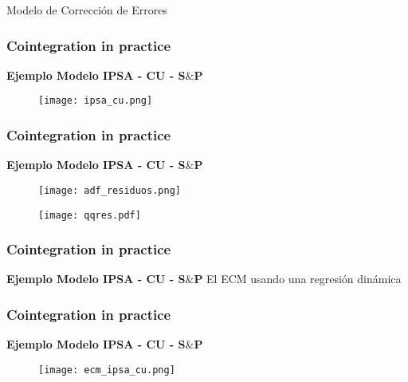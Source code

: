 \documentclass[spanish,xcolor=table]{beamer}
\begin{document}
\begin{section}{Modelo de Correcci\'on de Errores}
\begin{frame}
\end{frame}

\begin{frame}
\frametitle{Cointegration in practice}
\textbf{Ejemplo Modelo IPSA - CU - S$\&$P}

\begin{figure}[t!]
\texttt{[image: ipsa\_cu.png]}
\end{figure}
\end{frame}

\begin{frame}
\frametitle{Cointegration in practice}
\textbf{Ejemplo Modelo IPSA - CU - S$\&$P}

\begin{figure}[t!]
\texttt{[image: adf\_residuos.png]}
\end{figure}
\begin{figure}[t!]
\texttt{[image: qqres.pdf]}
\end{figure}
\end{frame}

\begin{frame}
\frametitle{Cointegration in practice}
\textbf{Ejemplo Modelo IPSA - CU - S$\&$P}
 \vspace{4mm}	
El ECM usando una regresi\'on din\'amica\\
 \vspace{4mm}	


\end{frame}

\begin{frame}
\frametitle{Cointegration in practice}
\textbf{Ejemplo Modelo IPSA - CU - S$\&$P}

\begin{figure}[t!]
\texttt{[image: ecm\_ipsa\_cu.png]}
\end{figure}
\end{frame}
\end{section}
\end{document}

